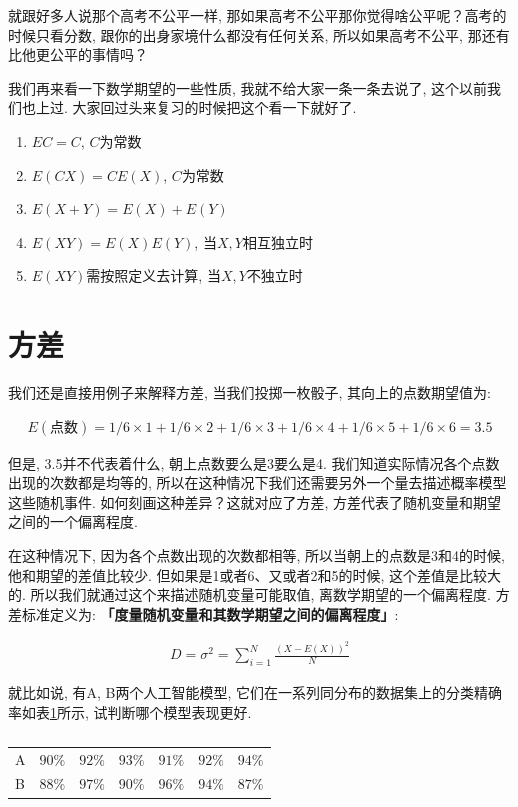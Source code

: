 就跟好多人说那个高考不公平一样, 那如果高考不公平那你觉得啥公平呢？高考的时候只看分数, 跟你的出身家境什么都没有任何关系, 所以如果高考不公平, 那还有比他更公平的事情吗？

我们再来看一下数学期望的一些性质, 我就不给大家一条一条去说了, 这个以前我们也上过. 大家回过头来复习的时候把这个看一下就好了. 

\begin{enumerate}
  \item $EC = C$, $C$为常数
  \item $E(CX) = CE(X)$, $C$为常数
  \item $E(X + Y) = E(X) + E(Y)$
  \item $E(XY) = E(X)E(Y)$, 当$X,Y$相互独立时
  \item $E(XY)$需按照定义去计算, 当$X,Y$不独立时
\end{enumerate}

\section{方差}

我们还是直接用例子来解释方差, 当我们投掷一枚骰子, 其向上的点数期望值为: 

\begin{align*}
  E(\mbox{点数})  = 1/6 \times 1 + 1/6 \times 2 + 1/6 \times 3 + 1/6 \times 4 + 1/6 \times 5 + 1/6 \times 6 = 3.5
\end{align*}

但是, 3.5并不代表着什么, 朝上点数要么是3要么是4. 我们知道实际情况各个点数出现的次数都是均等的, 所以在这种情况下我们还需要另外一个量去描述概率模型这些随机事件. 如何刻画这种差异？这就对应了方差, 方差代表了随机变量和期望之间的一个偏离程度. 

在这种情况下, 因为各个点数出现的次数都相等, 所以当朝上的点数是3和4的时候, 他和期望的差值比较少. 但如果是1或者6、又或者2和5的时候, 这个差值是比较大的. 所以我们就通过这个来描述随机变量可能取值, 离数学期望的一个偏离程度. 方差标准定义为: \textbf{「度量随机变量和其数学期望之间的偏离程度」}: 

\begin{align*}
  D = \sigma ^ 2 = \sum_{i=1}^N \frac{(X-E(X))^2}{N}
\end{align*}

就比如说, 有A, B两个人工智能模型, 它们在一系列同分布的数据集上的分类精确率如表\ref{tab:table22_1}所示, 试判断哪个模型表现更好. 

\begin{table}[ht]
  \centering
  \begin{tabular}{lllllll}
    \midrule
      A & $90\%$ & $92\%$ & $93\%$ & $91\%$ & $92\%$ & $94\%$  \\
      B & $88\%$ & $97\%$ & $90\%$ & $96\%$ & $94\%$ & $87\%$  \\
    \bottomrule
  \end{tabular}
  \caption{}
  \label{tab:table22_1}
\end{table}

